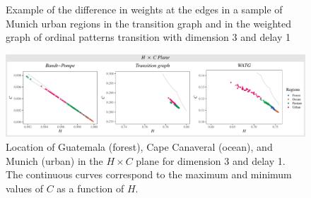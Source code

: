\documentclass[journal]{IEEEtran}
\begin{document}
	\begin{figure}[hbt]
		\centering
		\caption{Example of the difference in weights at the edges in a sample of Munich urban regions in the transition graph and in the weighted graph of ordinal patterns transition with dimension 3 and delay 1}
		\label{fig:graphs}
	\end{figure}
	
	\begin{figure}[hbt]
		\includegraphics[width=2\columnwidth]{Figures/HCAnalysis.pdf}
		\caption{Location of Guatemala (forest), Cape Canaveral (ocean), and Munich (urban) in the $H \times C$ plane for dimension 3 and delay 1. 
			The continuous curves correspond to the maximum and minimum values of $C$ as a function of $H$.}
		\label{fig:plotsHC}
	\end{figure}
	
\end{document}
